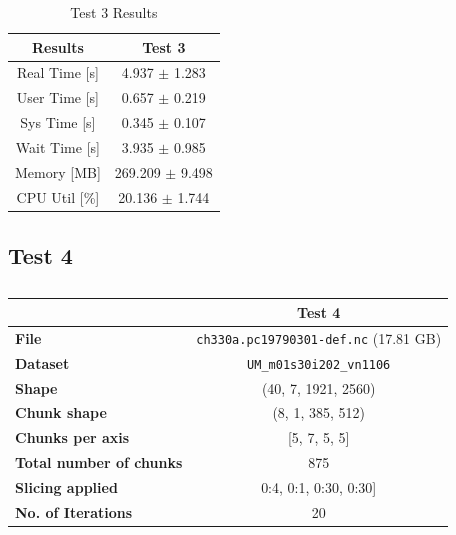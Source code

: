 \documentclass{article}
\begin{document}
\begin{table}[h!]
    \centering
    \begin{tabular}{cc}
        \hline
        \textbf{Results} & Test 3              \\ \hline
        Real Time [s]    &  4.937 $\pm$ 1.283   \\
        User Time [s]    &  0.657 $\pm$ 0.219   \\
        Sys Time [s]     &  0.345 $\pm$ 0.107   \\
        Wait Time [s]    &  3.935 $\pm$ 0.985   \\
        Memory [MB]      &  269.209 $\pm$ 9.498 \\
        CPU Util [\%]    &  20.136 $\pm$ 1.744  \\
        \hline
    \end{tabular}
    \caption{Test 3 Results}
    \label{tab:T3_Results}
\end{table}

\subsection{Test 4}
\begin{table}[h!] 
    \centering 
    \begin{tabular}{lc}  \hline
                                        & Test 4                                          \\ \hline
        \textbf{File}                   & \texttt{ch330a.pc19790301-def.nc} (17.81  GB)  \\  
        \textbf{Dataset}                & \texttt{UM\_m01s30i202\_vn1106}     \\ 
        \textbf{Shape}                  & (40, 7, 1921, 2560)                 \\ 
        \textbf{Chunk shape}            & (8, 1, 385, 512)                    \\ 
        \textbf{Chunks per axis}        & [5, 7, 5, 5]                        \\ 
        \textbf{Total number of chunks} & 875                                 \\ 
        \textbf{Slicing applied}        & 0:4, 0:1, 0:30, 0:30]               \\ 
        \textbf{No. of Iterations}      & 20                                  \\  \hline
    \end{tabular} 
    \caption{} 
    \label{tab:T4_Conditions} 
\end{table}
\end{document}
